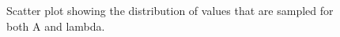 \documentclass{article}
\begin{document}
\newpage
\begin{figure}[H]
	\centerline{
		}
	\caption{Scatter plot showing the distribution of values that are sampled for both A and lambda.}
	\label{1.fig:r1_scat}
\end{figure}
\end{document}
